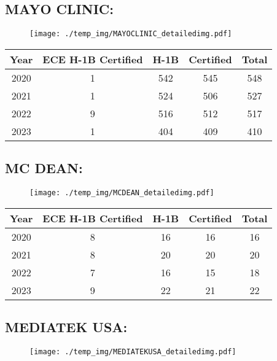 \documentclass{article}%
\begin{document}
%
\newpage%
\subsection{MAYO CLINIC:}%
\label{subsec:MAYOCLINIC}%
\label{MAYOCLINICdetailed}%


\begin{figure}[htbp]%
\centering%
\texttt{[image: ./temp\_img/MAYOCLINIC\_detailedimg.pdf]}%
\end{figure}

%
\begin{longtable}{c|c|c|c|c}%
\hline%
Year&ECE H{-}1B Certified&H{-}1B&Certified&Total\\%
\hline%
2020&1&542&545&548\\%
\hline%
2021&1&524&506&527\\%
\hline%
2022&9&516&512&517\\%
\hline%
2023&1&404&409&410\\%
\hline%
\end{longtable}

%
\newpage%
\subsection{MC DEAN:}%
\label{subsec:MCDEAN}%
\label{MCDEANdetailed}%


\begin{figure}[htbp]%
\centering%
\texttt{[image: ./temp\_img/MCDEAN\_detailedimg.pdf]}%
\end{figure}

%
\begin{longtable}{c|c|c|c|c}%
\hline%
Year&ECE H{-}1B Certified&H{-}1B&Certified&Total\\%
\hline%
2020&8&16&16&16\\%
\hline%
2021&8&20&20&20\\%
\hline%
2022&7&16&15&18\\%
\hline%
2023&9&22&21&22\\%
\hline%
\end{longtable}

%
\newpage%
\subsection{MEDIATEK USA:}%
\label{subsec:MEDIATEKUSA}%
\label{MEDIATEKUSAdetailed}%


\begin{figure}[htbp]%
\centering%
\texttt{[image: ./temp\_img/MEDIATEKUSA\_detailedimg.pdf]}%
\end{figure}
\end{document}
